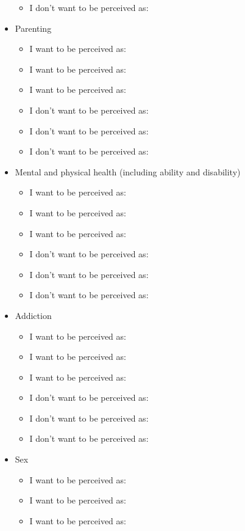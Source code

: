 \documentclass[12pt,letterpaper]{article}
\begin{document}
\begin{itemize}
\begin{itemize}
        \item I don't want to be perceived as:
    \end{itemize}
    \item Parenting
    \begin{itemize}
        \item I want to be perceived as:
        \item I want to be perceived as:
        \item I want to be perceived as:
        \item I don't want to be perceived as:
        \item I don't want to be perceived as:
        \item I don't want to be perceived as:
    \end{itemize}
    \item Mental and physical health (including ability and disability)
    \begin{itemize}
        \item I want to be perceived as:
        \item I want to be perceived as:
        \item I want to be perceived as:
        \item I don't want to be perceived as:
        \item I don't want to be perceived as:
        \item I don't want to be perceived as:
    \end{itemize}
    \item Addiction
    \begin{itemize}
        \item I want to be perceived as:
        \item I want to be perceived as:
        \item I want to be perceived as:
        \item I don't want to be perceived as:
        \item I don't want to be perceived as:
        \item I don't want to be perceived as:
    \end{itemize}
    \item Sex
    \begin{itemize}
        \item I want to be perceived as:
        \item I want to be perceived as:
        \item I want to be perceived as:

\end{itemize}
\end{itemize}
\end{document}
